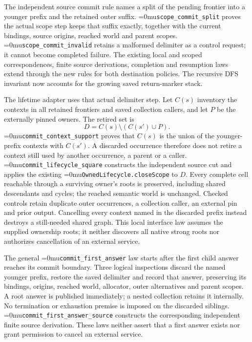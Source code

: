 \documentclass[11pt,a4paper]{article}
\newcommand{\name}[1]{\textup{\Urlmuskip=0mu\relax\nolinkurl{#1}}}
\begin{document}
The independent source commit rule names a split of the pending frontier into
a younger prefix and the retained outer suffix. \name{scope_commit_split}
proves the actual scope step keeps that suffix exactly, together with the
current bindings, source origins, reached world and parent scopes.
\name{scope_commit_invalid} retains a malformed delimiter as a control
request; it cannot become completed failure. The existing local and scoped
correspondences, finite source derivations, completion and resumption laws
extend through the new rules for both destination policies. The recursive
DFS invariant now accounts for the growing saved return-marker stack.

The lifetime adapter uses that actual delimiter step. Let $C(s)$ inventory
the contexts in all retained frontiers and saved collection callers, and let
$P$ be the externally pinned owners. The retired set is
\[
  D=C(s)\setminus(C(s')\cup P).
\]
\name{commit_context_support} proves that $C(s)$ is the union of the
younger-prefix contexts with $C(s')$. A discarded occurrence therefore does
not retire a context still used by another occurrence, a parent or a caller.
\name{commit_lifecycle_square} constructs the independent source cut and
applies the existing \name{OwnedLifecycle.closeScope} to $D$. Every complete
cell reachable through a surviving owner's roots is preserved, including
shared descendants and cycles; the reached semantic world is unchanged.
Checked controls retain duplicate outer occurrences, a collection caller,
an external pin and prior output. Cancelling every context named in the
discarded prefix instead destroys a still-needed shared graph. This local
interface law assumes the supplied ownership roots; it neither discovers all
native strong roots nor authorizes cancellation of an external service.

The general \name{commit\_first\_answer} law starts after the first child
answer reaches its commit boundary. Three logical inspections discard the
named younger prefix, restore the saved delimiter and record that answer,
preserving its bindings, origins, reached world, allocator, outer alternatives
and parent scopes. A root answer is published immediately; a nested collection
retains it internally. No termination or exhaustion premise is imposed on
the discarded siblings. \name{commit\_first\_answer\_source} constructs the
corresponding independent finite source derivation. These laws neither
assert that a first answer exists nor grant permission to cancel an external
service.
\end{document}
